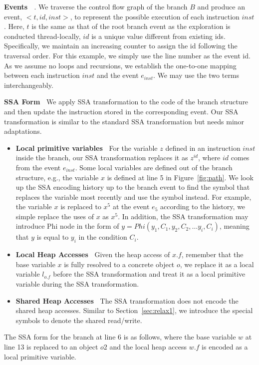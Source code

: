 {\bf Events \ }. We traverse the control flow graph of the branch $B$ and produce an event, $<t, id, inst>$, to represent the possible execution of each instruction $inst$. Here, $t$ is the same as that of the root branch event as the exploration is conducted thread-locally, $id$ is a unique value different from existing ids. Specifically,  we maintain an increasing counter to assign the id following the traversal order. For this example, we simply use the line number as the event id.
As we assume no loops and recursions, we establish the one-to-one mapping between each instruction $inst$ and the event $e_{inst}$.  We may use the two terms interchangeably.


{\bf SSA Form\ }  We apply SSA transformation to the code of the branch structure and then update the instruction stored in the corresponding event. Our SSA transformation is similar to the standard SSA transformation but needs minor adaptations. 
\begin{itemize}
\item {\bf Local primitive variables\ }  For the variable $z$ defined in an instruction $inst$ inside the branch, our SSA transformation replaces it as $z^{id}$, where $id$ comes from the event $e_{inst}$. Some local variables are defined out of the branch structure, e.g., the variable $x$ is defined at line 5 in Figure~\ref{fig:path}. We look up the SSA encoding history up to the branch event to find the symbol that replaces the variable most recently and use the symbol instead. For example, the variable $x$ is replaced to $x^5$ at the event $e_5$ according to the history, we simple replace the uses of $x$ as $x^5$. In addition, the SSA transformation may introduce Phi node in the form of $y=Phi(y_1, C_1, y_2, C_2, \dots y_i, C_i)$, meaning that $y$ is equal to $y_i$ in the condition $C_i$.
\item {\bf Local Heap Accesses\ } Given the heap access of $x.f$, remember that the base variable $x$ is fully resolved to a concrete object $o$, we replace it as a local variable $l_{o.f}$ before the SSA transformation and treat it as a local primitive variable during the SSA transformation. 
\item {\bf Shared Heap Accesses\ } The SSA transformation does not encode the shared heap accesses. Similar to Section~\ref{sec:relax1}, we introduce the special symbols to denote the shared read/write.
\end{itemize}

The SSA form for the branch at line 6 is as follows, where the base variable $w$ at line 13 is replaced to an object $o2$ and the local heap access $w.f$ is encoded as a local primitive variable.


